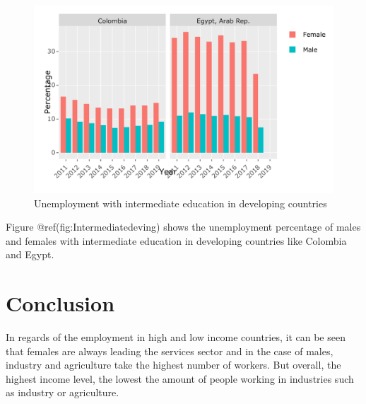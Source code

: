 \documentclass[
]{article}
\begin{document}
\begin{figure}
\centering
\includegraphics{The_Outsiders_5513_files/figure-latex/Intermediatedeving-1.pdf}
\caption{Unemployment with intermediate education in developing
countries}
\end{figure}

Figure @ref(fig:Intermediatedeving) shows the unemployment percentage of
males and females with intermediate education in developing countries
like Colombia and Egypt.

\clearpage

\hypertarget{conclusion}{%
\section{Conclusion}\label{conclusion}}

In regards of the employment in high and low income countries, it can be
seen that females are always leading the services sector and in the case
of males, industry and agriculture take the highest number of workers.
But overall, the highest income level, the lowest the amount of people
working in industries such as industry or agriculture.

\clearpage

\printbibliography
\end{document}
